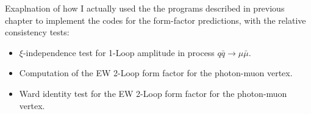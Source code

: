 Exaplnation of how I actually used the the programs described in previous chapter to implement the codes for the form-factor predictions, with the relative consistency tests:

\begin{itemize}
	\item $\xi$-independence test for 1-Loop amplitude in process $q \bar{q} \rightarrow \mu \bar{\mu}$.

	\item Computation of the EW 2-Loop form factor for the photon-muon vertex.
	
	\item Ward identity test for the EW 2-Loop form factor for the photon-muon vertex.
\end{itemize}